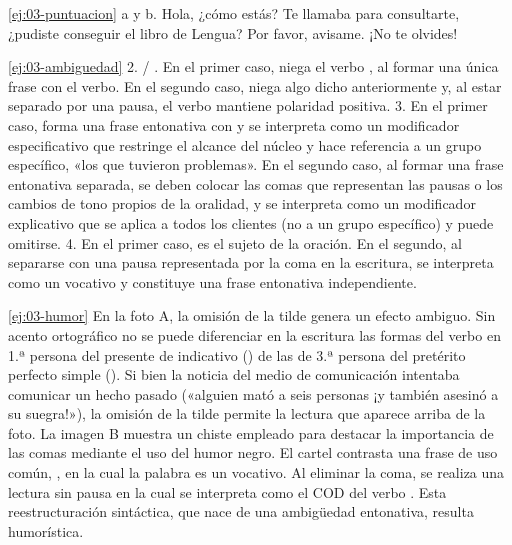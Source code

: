 \begin{solucion}{\ref{ej:03-puntuacion}}
a y b. Hola, ¿cómo estás? Te llamaba para consultarte, ¿pudiste conseguir el
libro de Lengua? Por favor, avisame. ¡No te olvides!
\end{solucion}

\begin{solucion}{\ref{ej:03-ambiguedad}}
2.  / . En el primer caso,  niega el verbo , al
formar una única frase con el verbo. En el segundo caso, niega algo dicho
anteriormente y, al estar separado por una pausa, el verbo 
mantiene polaridad positiva. 3. En el primer caso,  forma una frase entonativa con  y se interpreta como
un modificador especificativo que restringe el alcance del núcleo y hace
referencia a un grupo específico, «los que tuvieron problemas». En el segundo
caso, al formar una frase entonativa separada, se deben colocar las comas que
representan las pausas o los cambios de tono propios de la oralidad, y
 se interpreta como un modificador explicativo que
se aplica a todos los clientes (no a un grupo específico) y puede omitirse. 4.
En el primer caso,  es el sujeto de la oración. En el segundo,
al separarse con una pausa representada por la coma en la escritura, se
interpreta como un vocativo y constituye una frase entonativa independiente.
\end{solucion}

\begin{solucion}{\ref{ej:03-humor}}
En la foto A, la omisión de la tilde genera un efecto ambiguo. Sin acento
ortográfico no se puede diferenciar en la escritura las formas del verbo en
1.ª persona del presente de indicativo () de las de
3.ª persona del pretérito perfecto simple (). Si bien la
noticia del medio de comunicación intentaba comunicar un hecho pasado («alguien
mató a seis personas ¡y también asesinó a su suegra!»), la omisión de la tilde
permite la lectura que aparece arriba de la foto. La imagen B muestra un chiste
empleado para destacar la importancia de las comas mediante el uso del humor
negro. El cartel contrasta una frase de uso común, , en la cual la palabra  es un vocativo. Al eliminar la coma,
se realiza una lectura sin pausa en la cual  se interpreta como el
COD del verbo . Esta reestructuración sintáctica, que nace de una
ambigüedad entonativa, resulta humorística.
\end{solucion}

